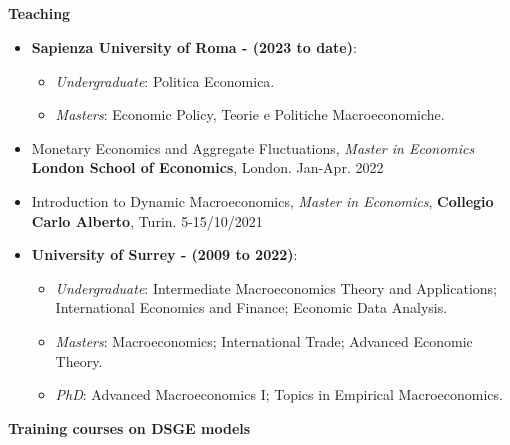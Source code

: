 \documentclass[margin, 11pt]{res} %
\begin{document}
\begin{resume}
\section{}

\textbf{Teaching}

\begin{itemize}
    \item \textbf{Sapienza University of Roma - (2023 to date)}:
    \begin{itemize}
        \item \emph{Undergraduate}: Politica Economica. 
        \item \emph{Masters}: Economic Policy, Teorie e Politiche Macroeconomiche.  
    \end{itemize}

    \item Monetary Economics and Aggregate Fluctuations, \emph{Master in Economics} \textbf{London School of Economics}, London. \hfill Jan-Apr. 2022 
    \item Introduction to Dynamic Macroeconomics, \emph{Master in Economics}, \textbf{Collegio Carlo Alberto}, Turin. \hfill 5-15/10/2021 
    \item \textbf{University of Surrey - (2009 to 2022)}:

\begin{itemize}
	\item \emph{Undergraduate}: Intermediate Macroeconomics Theory and Applications; International Economics and Finance; Economic Data Analysis. 
	\item \emph{Masters}: Macroeconomics; International Trade; Advanced Economic Theory. 
	\item \emph{PhD}: Advanced Macroeconomics I; Topics in Empirical Macroeconomics. 
\end{itemize}
\end{itemize}



\textbf{Training courses on DSGE models}


\end{resume}
\end{document}
